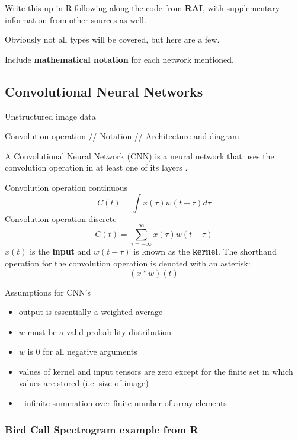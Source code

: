 Write this up in R following along the code from \textbf{RAI}, with supplementary information from other sources as well.  

Obviously not all types will be covered, but here are a few.  

Include \textbf{mathematical notation} for each network mentioned.


\subsection{Convolutional Neural Networks}
Unstructured image data

Convolution operation // Notation // Architecture and diagram

A Convolutional Neural Network (CNN) is a neural network that uses the convolution operation in at least one of its layers \cite{?}.

Convolution operation continuous
$$
C(t) = \int x(\tau)w(t - \tau)d\tau
$$
Convolution operation discrete
$$
C(t) = \sum_{\tau = -\infty}^\infty x(\tau)w(t - \tau)
$$
$x(t)$ is the \textbf{input} and $w(t-\tau)$ is known as the \textbf{kernel}. The shorthand operation for the convolution operation is denoted with an asterisk:
$$
(x * w)(t)
$$

Assumptions for CNN's \cite{Goodfellow-et-al-2016}

\begin{itemize}
  \tightlist
  \item
output is essentially a weighted average  
 \item
$w$ must be a valid probability distribution
 \item
$w$ is 0 for all negative arguments
 \item
values of kernel and input tensors are zero except for the finite set in which values are stored (i.e. size of image)
 \item
 - infinite summation over finite number of array elements
\end{itemize}


\subsubsection{Bird Call Spectrogram example from R}

